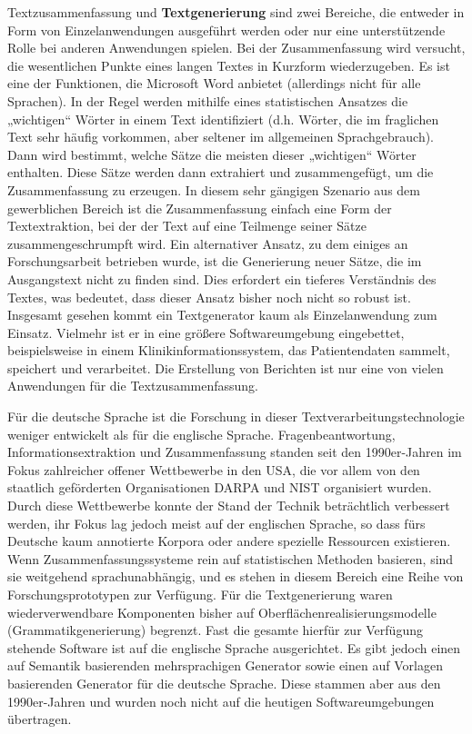 \documentclass[]{../../metanetpaper}
\begin{document}
\begin{Parallel}[c]{79mm}{78mm}
{Textzusammenfassung und \textbf{Textgenerierung} sind zwei Bereiche, die entweder in Form von Einzelanwendungen ausgeführt werden oder nur eine unterstützende Rolle bei anderen Anwendungen spielen. Bei der Zusammenfassung wird versucht, die wesentlichen Punkte eines langen Textes in Kurzform wiederzugeben. Es ist eine der Funktionen, die Microsoft Word anbietet (allerdings nicht für alle Sprachen). In der Regel werden mithilfe eines statistischen Ansatzes die „wichtigen“ Wörter in einem Text identifiziert (d.h. Wörter, die im fraglichen Text sehr häufig vorkommen, aber seltener im allgemeinen Sprachgebrauch). Dann wird bestimmt, welche Sätze die meisten dieser „wichtigen“ Wörter enthalten. Diese Sätze werden dann extrahiert und zusammengefügt, um die Zusammenfassung zu erzeugen. In diesem sehr gängigen Szenario aus dem gewerblichen Bereich ist die Zusammenfassung einfach eine Form der Textextraktion, bei der der Text auf eine Teilmenge seiner Sätze zusammengeschrumpft wird. Ein alternativer Ansatz, zu dem einiges an Forschungsarbeit betrieben wurde, ist die Generierung neuer Sätze, die im Ausgangstext nicht zu finden sind.  Dies erfordert ein tieferes Verständnis des Textes, was bedeutet, dass dieser Ansatz bisher noch nicht so robust ist. Insgesamt gesehen kommt ein Textgenerator kaum als Einzelanwendung zum Einsatz. Vielmehr ist er in eine größere Softwareumgebung eingebettet, beispielsweise in einem Klinikinformationssystem, das Patientendaten sammelt, speichert und verarbeitet. Die Erstellung von Berichten ist nur eine von vielen Anwendungen für die Textzusammenfassung. 

Für die deutsche Sprache ist die Forschung in dieser Textverarbeitungstechnologie weniger entwickelt als für die englische Sprache. Fragenbeantwortung, Informationsextraktion und Zusammenfassung standen seit den 1990er-Jahren im Fokus zahlreicher offener Wettbewerbe in den USA, die vor allem von den staatlich geförderten Organisationen DARPA und NIST organisiert wurden. Durch diese Wettbewerbe konnte der Stand der Technik beträchtlich verbessert werden, ihr Fokus lag jedoch meist auf der englischen Sprache, so dass fürs Deutsche kaum annotierte Korpora oder andere spezielle Ressourcen existieren. Wenn Zusammenfassungssysteme rein auf statistischen Methoden basieren, sind sie weitgehend sprachunabhängig, und es stehen in diesem Bereich eine Reihe von Forschungsprototypen zur Verfügung. Für die Textgenerierung waren wiederverwendbare Komponenten bisher auf Oberflächenrealisierungsmodelle (Grammatikgenerierung) begrenzt. Fast die gesamte hierfür zur Verfügung stehende Software ist auf die englische Sprache ausgerichtet. Es gibt jedoch einen auf Semantik basierenden mehrsprachigen Generator sowie einen auf Vorlagen basierenden Generator für die deutsche Sprache. Diese stammen aber aus den 1990er-Jahren und wurden noch nicht auf die heutigen Softwareumgebungen übertragen.
  }


\end{Parallel}
\end{document}
